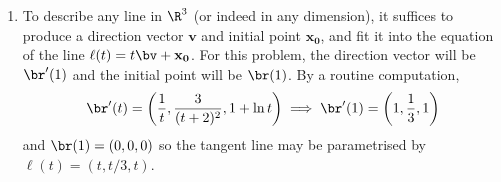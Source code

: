 \begin{enumerate}
{    }
    {(i) The function is $f(x) = \frac{2}{9}x^2$. One way to see this is that $y(t) = \frac{2}{9}(x(t))^2$. This is one particular manifestation of how one can parametrise any function $y=f(x)$. \\\\
(ii) We perform the routine calculation:
\begin{align*}
    \mathbf {v}(t) &= \frac{d}{dt}\left(e^t,\frac{2}{9}e^{2t}\right) = \left(e^t,\frac{4}{9}e^{2t}\right)\\
    \mathbf {a}(t) &= \frac{d}{dt}\left(e^t,\frac{4}{9}e^{2t}\right) = \left(e^t,\frac{8}{9}e^{2t}\right)
\end{align*}\\\\
(iii) Plugging in $t = \ln 3$, 
\begin{align*}
    \mathbf {v}(\ln 3) &= \left(3,4\right)\\
    \mathbf {a}(\ln 3) &=  \left(3,8\right)
\end{align*}
    } 
    \item {}
    {%

    }
    {To describe any line in $\R^3$ (or indeed in any dimension), it suffices to produce a direction vector $\mathbf{v}$ and initial point $\mathbf{x_0}$, and fit it into the equation of the line $\ell(t) = t\bv + \mathbf{x_0}$. For this problem, the direction vector will be $\br'(1)$ and the initial point will be $\br(1)$. By a routine computation, 
\begin{equation*}
    \br'(t) = \left(\frac{1}{t}, \frac{3}{(t+2)^2}, 1+\ln t\right) \implies \br'(1) = \left(1,\frac{1}{3},1\right)
\end{equation*}
and $\br(1) = (0,0,0)$ so the tangent line may be parametrised by $\ell(t) = (t,t/3,t)$.
    } 
\end{enumerate}
